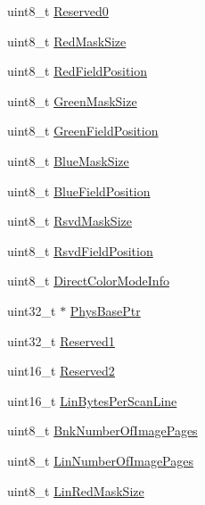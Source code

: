 \begin{DoxyCompactItemize}
uint8\+\_\+t \mbox{\hyperlink{structRTEMS__PACKED_a71d2cdd271c701fb8ccf016306d605e7}{Reserved0}}
\item 
uint8\+\_\+t \mbox{\hyperlink{structRTEMS__PACKED_a0263a2cfd74fdfbe94bceeae02789bc2}{Red\+Mask\+Size}}
\item 
uint8\+\_\+t \mbox{\hyperlink{structRTEMS__PACKED_af7ff8a830edbe6f3055f658ad3df7e8e}{Red\+Field\+Position}}
\item 
uint8\+\_\+t \mbox{\hyperlink{structRTEMS__PACKED_a50543cd1fe37f201acd4f12b0b875d22}{Green\+Mask\+Size}}
\item 
uint8\+\_\+t \mbox{\hyperlink{structRTEMS__PACKED_a26d3593201e358f1eae6c557e74f5530}{Green\+Field\+Position}}
\item 
uint8\+\_\+t \mbox{\hyperlink{structRTEMS__PACKED_aefa5e8f1b1ffe616f00159eb2ad66bb5}{Blue\+Mask\+Size}}
\item 
uint8\+\_\+t \mbox{\hyperlink{structRTEMS__PACKED_af7348e223ff5e49cc70b2fa552b638b6}{Blue\+Field\+Position}}
\item 
uint8\+\_\+t \mbox{\hyperlink{structRTEMS__PACKED_a19e123d39237ad3f1d3bab6dccef53e5}{Rsvd\+Mask\+Size}}
\item 
uint8\+\_\+t \mbox{\hyperlink{structRTEMS__PACKED_ab15093511755d56e6bfe95425c293ae3}{Rsvd\+Field\+Position}}
\item 
uint8\+\_\+t \mbox{\hyperlink{structRTEMS__PACKED_aa3e7097ac147985b549b4357fd419dbd}{Direct\+Color\+Mode\+Info}}
\item 
uint32\+\_\+t $\ast$ \mbox{\hyperlink{structRTEMS__PACKED_a778fe863f1e84065311a70f241c113ee}{Phys\+Base\+Ptr}}
\item 
uint32\+\_\+t \mbox{\hyperlink{structRTEMS__PACKED_a8ebcccb23039a1755e787d0787a63bc5}{Reserved1}}
\item 
uint16\+\_\+t \mbox{\hyperlink{structRTEMS__PACKED_aaead0516ac543c139ae20b0a6c374e0b}{Reserved2}}
\item 
uint16\+\_\+t \mbox{\hyperlink{structRTEMS__PACKED_a66e88e3a76e6554aed6da08cf377d43c}{Lin\+Bytes\+Per\+Scan\+Line}}
\item 
uint8\+\_\+t \mbox{\hyperlink{structRTEMS__PACKED_a11261f83667c37c214ffc551863b52fb}{Bnk\+Number\+Of\+Image\+Pages}}
\item 
uint8\+\_\+t \mbox{\hyperlink{structRTEMS__PACKED_a46c019426338febaefbb553dfc763386}{Lin\+Number\+Of\+Image\+Pages}}
\item 
uint8\+\_\+t \mbox{\hyperlink{structRTEMS__PACKED_a83ba0604b8460234ce47d3b68230b981}{Lin\+Red\+Mask\+Size}}
\item 

\end{DoxyCompactItemize}
